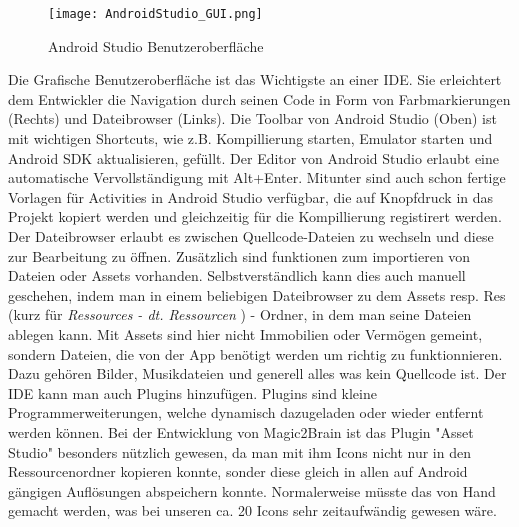 \begin{figure}[htbp] 
  \centering
     \texttt{[image: AndroidStudio\_GUI.png]}
  \caption{Android Studio Benutzeroberfläche \cite{ASGUI}}
  \label{fig:Android Studio GUI}
\end{figure}
Die Grafische Benutzeroberfläche ist das Wichtigste an einer IDE. Sie erleichtert dem Entwickler die Navigation durch seinen Code in Form von Farbmarkierungen (Rechts) und Dateibrowser (Links).
Die Toolbar von Android Studio (Oben) ist mit wichtigen Shortcuts, wie z.B. Kompillierung starten, Emulator starten und Android SDK aktualisieren, gefüllt.
Der Editor von Android Studio erlaubt eine automatische Vervollständigung mit Alt+Enter. Mitunter sind auch schon fertige Vorlagen für Activities in Android Studio verfügbar, die auf Knopfdruck in das Projekt kopiert werden und gleichzeitig für die Kompillierung registirert werden. Der Dateibrowser erlaubt es zwischen Quellcode-Dateien zu wechseln und diese zur Bearbeitung zu öffnen. Zusätzlich sind funktionen zum importieren von Dateien oder Assets vorhanden. Selbstverständlich kann dies auch manuell geschehen, indem man in einem beliebigen Dateibrowser zu dem Assets resp. Res (kurz für \textit{Ressources - dt. Ressourcen} ) - Ordner, in dem man seine Dateien ablegen kann. Mit Assets sind hier nicht Immobilien oder Vermögen gemeint, sondern Dateien, die von der App benötigt werden um richtig zu funktionnieren. Dazu gehören Bilder, Musikdateien und generell alles was kein Quellcode ist. Der IDE kann man auch Plugins hinzufügen. Plugins sind kleine Programmerweiterungen, welche dynamisch dazugeladen oder wieder entfernt werden können. Bei der Entwicklung von Magic2Brain ist das Plugin "Asset Studio" besonders nützlich gewesen, da man mit ihm Icons nicht nur in den Ressourcenordner kopieren konnte, sonder diese gleich in allen auf Android gängigen Auflösungen abspeichern konnte. Normalerweise müsste das von Hand gemacht werden, was bei unseren ca. 20 Icons sehr zeitaufwändig gewesen wäre.
